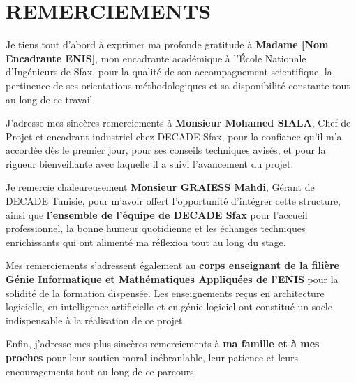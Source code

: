 \chapter*{REMERCIEMENTS}
\thispagestyle{MyStyle}

\vspace{0.5cm}

Je tiens tout d'abord à exprimer ma profonde gratitude à \textbf{Madame [Nom Encadrante ENIS]}, mon encadrante académique à l'École Nationale d'Ingénieurs de Sfax, pour la qualité de son accompagnement scientifique, la pertinence de ses orientations méthodologiques et sa disponibilité constante tout au long de ce travail.

\vspace{0.5cm}

J'adresse mes sincères remerciements à \textbf{Monsieur Mohamed SIALA}, Chef de Projet et encadrant industriel chez DECADE Sfax, pour la confiance qu'il m'a accordée dès le premier jour, pour ses conseils techniques avisés, et pour la rigueur bienveillante avec laquelle il a suivi l'avancement du projet.

\vspace{0.5cm}

Je remercie chaleureusement \textbf{Monsieur GRAIESS Mahdi}, Gérant de DECADE Tunisie, pour m'avoir offert l'opportunité d'intégrer cette structure, ainsi que \textbf{l'ensemble de l'équipe de DECADE Sfax} pour l'accueil professionnel, la bonne humeur quotidienne et les échanges techniques enrichissants qui ont alimenté ma réflexion tout au long du stage.

\vspace{0.5cm}

Mes remerciements s'adressent également au \textbf{corps enseignant de la filière Génie Informatique et Mathématiques Appliquées de l'ENIS} pour la solidité de la formation dispensée. Les enseignements reçus en architecture logicielle, en intelligence artificielle et en génie logiciel ont constitué un socle indispensable à la réalisation de ce projet.

\vspace{0.5cm}

Enfin, j'adresse mes plus sincères remerciements à \textbf{ma famille et à mes proches} pour leur soutien moral inébranlable, leur patience et leurs encouragements tout au long de ce parcours.